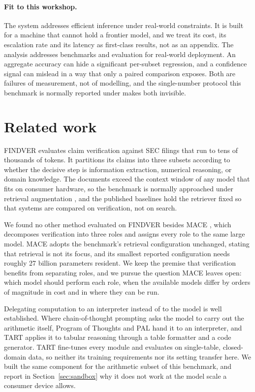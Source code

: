 \documentclass{article}
\begin{document}
\paragraph{Fit to this workshop.}
The system addresses efficient inference under real-world constraints. It is built for a
machine that cannot hold a frontier model, and we treat its cost, its escalation rate and
its latency as first-class results, not as an appendix. The analysis addresses benchmarks
and evaluation for real-world deployment. An aggregate accuracy can hide a significant
per-subset regression, and a confidence signal can mislead in a way that only a paired
comparison exposes. Both are failures of measurement, not of modelling, and the
single-number protocol this benchmark is normally reported under makes both invisible.

\section{Related work}
\label{sec:related}

FINDVER \citep{zhao2024findver} evaluates claim verification against SEC filings that run to
tens of thousands of tokens. It partitions its claims into three subsets according to
whether the decisive step is information extraction, numerical reasoning, or domain
knowledge. The documents exceed the context window of any model that fits on consumer
hardware, so the benchmark is normally approached under retrieval augmentation
\citep{lewis2020rag}, and the published baselines hold the retriever fixed so that systems
are compared on verification, not on search.

We found no other method evaluated on FINDVER besides MACE \citep{saha2026mace}, which
decomposes verification into three roles and assigns every role to the same large model.
MACE adopts the benchmark's retrieval configuration unchanged, stating that retrieval is not
its focus, and its smallest reported configuration needs roughly 27 billion parameters
resident. We keep the premise that verification benefits from separating roles, and we
pursue the question MACE leaves open: which model should perform each role, when the
available models differ by orders of magnitude in cost and in where they can be run.

Delegating computation to an interpreter instead of to the model is well established.
Where chain-of-thought prompting \citep{wei2022cot} asks the model to carry out the
arithmetic itself, Program of Thoughts \citep{chen2022pot} and PAL \citep{gao2022pal} hand
it to an interpreter,
and TART \citep{lu2025tart} applies it to tabular reasoning through a table formatter and a
code generator. TART fine-tunes every module and evaluates on single-table, closed-domain
data, so neither its training requirements nor its setting transfer here. We built the same
component for the arithmetic subset of this benchmark, and report in
Section~\ref{sec:sandbox} why it does not work at the model scale a consumer device allows.
\end{document}
